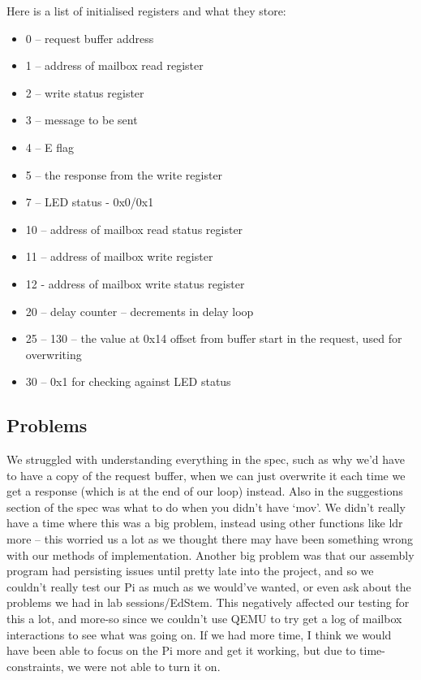 \documentclass[12pt]{article}
\begin{document}
Here is a list of initialised registers and what they store:
\begin{itemize}

\item 0 – request buffer address
\item 1 – address of mailbox read register
\item 2 – write status register
\item 3 – message to be sent
\item 4 – E flag
\item 5 – the response from the write register
\item 7 – LED status - 0x0/0x1
\item 10 – address of mailbox read status register
\item 11 – address of mailbox write register
\item 12 - address of mailbox write status register
\item 20 – delay counter – decrements in delay loop
\item 25 –  130 – the value at 0x14 offset from buffer start in the request, used for overwriting
\item 30 –  0x1 for checking against LED status

\end{itemize}

\subsection{Problems}

We struggled with understanding everything in the spec, such as why we’d have to have a copy of the request buffer, when we can just overwrite it each time we get a response (which is at the end of our loop) instead. Also in the suggestions section of the spec was what to do when you didn’t have ‘mov’. We didn’t really have a time where this was a big problem, instead using other functions like ldr more – this worried us a lot as we thought there may have been something wrong with our methods of implementation. Another big problem was that our assembly program had persisting issues until pretty late into the project, and so we couldn’t really test our Pi as much as we would’ve wanted, or even ask about the problems we had in lab sessions/EdStem. This negatively affected our testing for this a lot, and more-so since we couldn’t use QEMU to try get a log of mailbox interactions to see what was going on. If we had more time, I think we would have been able to focus on the Pi more and get it working, but due to time-constraints, we were not able to turn it on.
\end{document}
